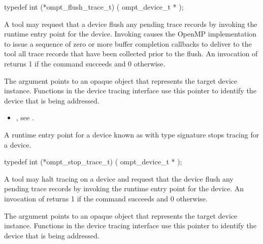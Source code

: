\begin{ccppspecific}
\begin{omptInquiry}
typedef int (*ompt_flush_trace_t) (
  ompt_device_t *
);
\end{omptInquiry}
\end{ccppspecific}

\descr

A tool may request that a device flush any pending trace records
by invoking the  runtime entry point for the device.
Invoking  causes the OpenMP implementation to issue a sequence 
of zero or more buffer completion callbacks to deliver to the tool all trace records 
that have been collected prior to the flush.
An invocation of  returns 1 if the command
succeeds and 0 otherwise.

\argdesc
The  argument points to an opaque object that represents
the target device instance. Functions in the device tracing interface
use this pointer to identify the device that is being addressed.

\crossreferences
\begin{itemize}
\item {},
see .
\end{itemize}

\label{sec:ompt_stop_trace_t}

\summary
A runtime entry point for a device known as 
with type signature 
stops tracing for a device.

\begin{ccppspecific}
\begin{omptInquiry}
typedef int (*ompt_stop_trace_t) (
  ompt_device_t *
);
\end{omptInquiry}
\end{ccppspecific}

\descr

A tool may halt tracing on a device and request that the device flush any pending trace records
by invoking the  runtime entry point for the device.
An invocation of  returns 1 if the command
succeeds and 0 otherwise.

\argdesc
The  argument points to an opaque object that represents
the target device instance. Functions in the device tracing interface
use this pointer to identify the device that is being addressed.



